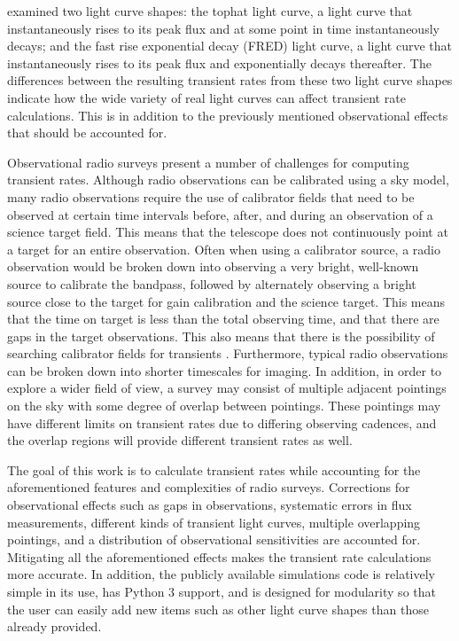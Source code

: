 \documentclass[12pt]{article}
\begin{document}
\citet{2017MNRAS.465.4106C} examined two light curve shapes: the tophat light curve, a light curve that instantaneously rises to its peak flux and at some point in time instantaneously decays; and the fast rise exponential decay (FRED) light curve, a light curve that instantaneously rises to its peak flux and exponentially decays thereafter. The differences between the resulting transient rates from these two light curve shapes indicate how the wide variety of real light curves can affect transient rate calculations. This is in addition to the previously mentioned observational effects that should be accounted for. 

Observational radio surveys present a number of challenges for computing transient rates. Although radio observations can be calibrated using a sky model, many radio observations require the use of calibrator fields that need to be observed at certain time intervals before, after, and during an observation of a science target field. This means that the telescope does not continuously point at a target for an entire observation. Often when using a calibrator source, a radio observation would be broken down into observing a very bright, well-known source to calibrate the bandpass, followed by alternately observing a bright source close to the target for gain calibration and the science target. This means that the time on target is less than the total observing time, and that there are gaps in the target observations. This also means that there is the possibility of searching calibrator fields for transients \citep{2011ApJ...728L..14B}. Furthermore, typical radio observations can be broken down into shorter timescales for imaging. In addition, in order to explore a wider field of view, a survey may consist of multiple adjacent pointings on the sky with some degree of overlap between pointings. These pointings may have different limits on transient rates due to differing observing cadences, and the overlap regions will provide different transient rates as well.

The goal of this work is to calculate transient rates while accounting for the aforementioned features and complexities of radio surveys. Corrections for observational effects such as gaps in observations, systematic errors in flux measurements, different kinds of transient light curves, multiple overlapping pointings, and a distribution of observational sensitivities are accounted for. Mitigating all the aforementioned effects makes the transient rate calculations more accurate. In addition, the publicly available simulations code is relatively simple in its use, has Python 3 support, and is designed for modularity so that the user can easily add new items such as other light curve shapes than those already provided.
\end{document}
